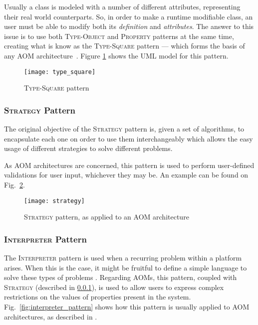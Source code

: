 Usually a class is modeled with a number of different attributes, representing their real world counterparts. So, in order to make a runtime modifiable class, an user must be able to modify both its \emph{definition} and \emph{attributes}. The answer to this issue is to use both \textsc{Type-Object} and \textsc{Property} patterns at the same time, creating what is know as the \textsc{Type-Square} pattern --- which forms the basis of any AOM architecture~\cite{YJ02}. Figure \ref{fig:type_square} shows the UML model for this pattern.

\begin{figure}[H]
  \centering
  \texttt{[image: type\_square]}
  \caption{\textsc{Type-Square} pattern}
  \label{fig:type_square}
\end{figure}

\subsubsection{\textsc{Strategy} Pattern}\label{sec:strategy_pattern}

The original objective of the \textsc{Strategy} pattern is, given a set of algorithms, to encapsulate each one on order to use them interchangeably which allows the easy usage of different strategies to solve different problems\cite{gang_of_four}.

As AOM architectures are concerned, this pattern is used to perform user-defined validations for user input, whichever they may be. An example can be found on Fig.~\ref{fig:strategy_pattern}.

\begin{figure}[H]
  \centering
  \texttt{[image: strategy]}
  \caption{\textsc{Strategy} pattern, as applied to an AOM architecture}
  \label{fig:strategy_pattern}
\end{figure}

\subsubsection{\textsc{Interpreter} Pattern}\label{sec:interpreter_pattern}

The \textsc{Interpreter} pattern is used when a recurring problem within a platform arises. When this is the case, it might be fruitful to define a simple language to solve these types of problems \cite{gang_of_four}. Regarding AOMs, this pattern, coupled with \textsc{Strategy} (described in \ref{sec:strategy_pattern}), is used to allow users to express complex restrictions on the values of properties present in the system. Fig.~\ref{fig:interpreter_pattern} shows how this pattern is usually applied to AOM architectures, as described in \cite{phd_hugo_ferreira}.


